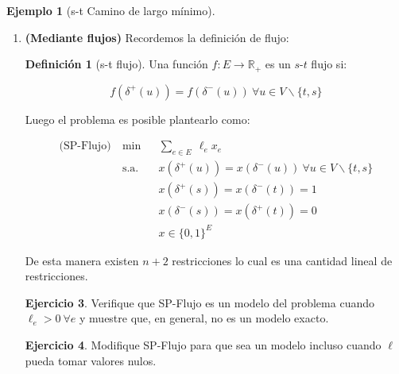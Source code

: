 \documentclass[10pt]{article}
\newcommand{\RR}{\mathbb R}
\theoremstyle{plain}
\theoremstyle{definition}
\newtheorem{defi}{Definición}
\newtheorem{eje}{Ejemplo}
\newtheorem{ejer}{Ejercicio}
\begin{document}
\begin{eje}[s-t Camino de largo mínimo]
\begin{enumerate}[\bf I.-]
\begin{ejer}
Probar que para el problema $s$-$t$ camino de coste mínimo y $\ell_e{} >0 ~ \forall e$ entonces SP-Conector es un modelo. Y probar que (en general) no es un modelo exacto.
\end{ejer}
\begin{ejer}
Modificar SP-Conector para que incluso cuando $\ell$ pueda tomar valores nulos sea un modelo.
\end{ejer}
\vspace{0.1 mm}
Es importante notar que la cantidad de restricciones crece de manera exponencial con el tamaño, luego, si bien el modelo soluciona el problema, en la practica el tiempo en que se ejecute el programa va a ser grande.

Por lo anterior es conveniente plantear el problema de otra manera. 
\newpage
    \item \textbf{(Mediante flujos)} Recordemos la definición de flujo: 
    
    
\begin{defi}[s-t flujo] Una función $f:E \to \RR_{+}$ es un $s$-$t$ flujo si:

$$
f\left(\delta^{+}(u)\right)=f\left(\delta^{-}(u)\right) ~ \forall u \in V \backslash\{t,s\}
$$
\end{defi}
Luego el problema es posible plantearlo como:

\begin{equation*}
\begin{aligned}
\textrm{(SP-Flujo)}~ & \min
& & \displaystyle{\sum_{e \in E}}~\ell_{e}x_{e}\\
& \text{s.a.}
& & x(\delta^{+}(u))=x(\delta^{-}(u))~ \forall u \in V \backslash\{t,s\} \\
&&& x(\delta^{+}(s))=x(\delta^{-}(t))=1\\
&&& x(\delta^{-}(s))=x(\delta^{+}(t))=0\\
&&& x \in\{0,1\}^{E}
\end{aligned}
\end{equation*}


De esta manera existen $n+2$ restricciones lo cual es una cantidad lineal de restricciones.

\begin{ejer}
Verifique que SP-Flujo es un modelo del problema cuando $\ell_{e} >0 ~\forall e$ y muestre que, en general, no es un modelo exacto.
\end{ejer}
\begin{ejer}
Modifique SP-Flujo para que sea un modelo incluso cuando $\ell$ pueda tomar valores nulos.
\end{ejer}


\end{enumerate}
\end{eje}
\end{document}

